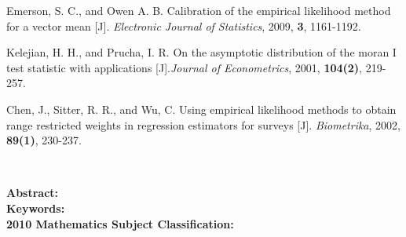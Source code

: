 \documentclass[a4paper,c5size,onecolumn,twoside,cap,Chinese]{APSart}
\begin{document}
\begin{thebibliography}{99}
Emerson, S. C., and Owen A. B. Calibration of the empirical likelihood method for a vector mean [J]. {\it Electronic Journal of Statistics}, 2009, {\bf 3}, 1161-1192. 

 Kelejian, H. H., and Prucha, I. R. On the asymptotic distribution of the moran I test statistic with applications [J].{\it  Journal of Econometrics}, 2001, {\bf 104(2)}, 219-257.

 Chen, J., Sitter, R. R., and Wu, C. Using empirical likelihood methods to obtain range restricted weights in regression estimators for surveys [J].  {\it Biometrika}, 2002, {\bf 89(1)}, 230-237.

\end{thebibliography}

\vspace{6mm}\hspace{-8mm}
\parbox{\textwidth}{
\begin{center}
\Large{\bf{\entitle}}\\[1em]
\author{\fangsong{\enfirstauthor\hy\hy\hy\ensecondauthor}\\[-1pt]
{(\ensecondinst)}}
\end{center}

\mbox{}\hspace{2em}\textbf{Abstract:}\quad\enabstract\\
\mbox{}\hspace{2em}\textbf{Keywords:}\quad\enkeywords\\
\mbox{}\hspace{2em}\textbf{2010 Mathematics Subject Classification:}\quad\amsno}

\clearpage
\end{document}
